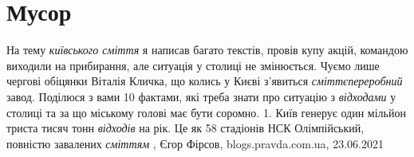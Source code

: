  
 
 
 
 
\chapter{Мусор}

На тему \emph{київського сміття} я написав багато текстів, провів купу акцій,
командою виходили на прибирання, але ситуація у столиці не змінюється. Чуємо
лише чергові обіцянки Віталія Кличка, що колись у Києві з'явиться
\emph{сміттєпереробний} завод. Поділюся з вами 10 фактами, які треба знати про
ситуацію з \emph{відходами} у столиці та за що міському голові має бути
соромно. 1. Київ генерує один мільйон триста тисяч тонн \emph{відходів} на рік.
Це як 58 стадіонів НСК Олімпійський, повністю завалених \emph{сміттям}
, 
Єгор Фірсов, blogs.pravda.com.ua, 23.06.2021

